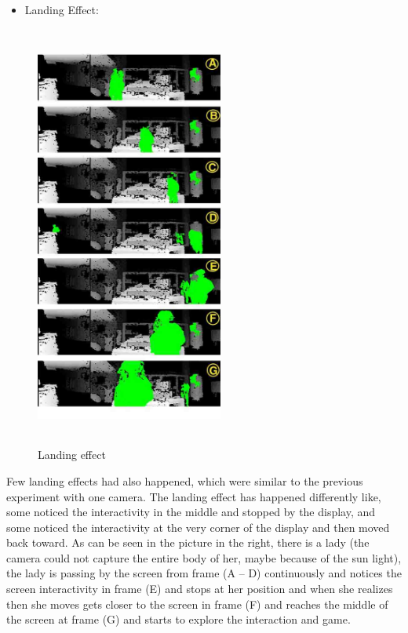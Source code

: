 \newpage
\begin{itemize}

\item Landing Effect:

\end{itemize}


\begin{figure}
  \vspace{-30pt}
  \begin{center}
    \includegraphics[width=0.55\textwidth,height=140mm]{Figures/9/effects/landing}
  \end{center}
  \vspace{-20pt}
  \caption{Landing effect}
  \vspace{-60pt}
\end{figure}
Few landing effects had also happened, which were similar to the previous experiment with one camera. The landing effect has happened differently like, some noticed the interactivity in the middle and stopped by the display, and some noticed the interactivity at the very corner of the display and then moved back toward. 
As can be seen in the picture in the right, there is a lady (the camera could not capture the entire body of her, maybe because of the sun light), the lady is passing by the screen from frame (A – D) continuously and notices the screen interactivity in frame (E) and stops at her position and when she realizes then she moves gets closer to the screen in frame (F) and reaches the middle of the screen at frame (G) and starts to explore the interaction and game.




